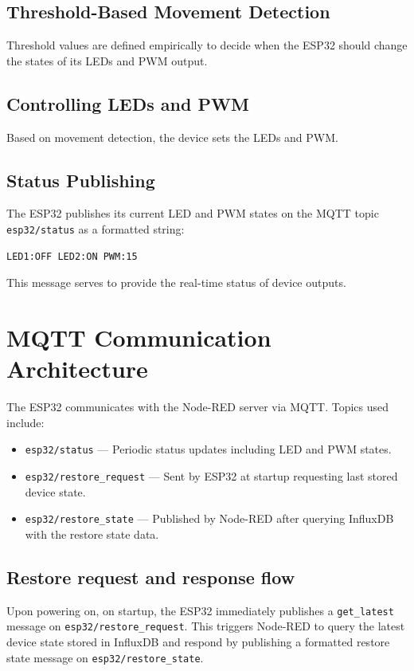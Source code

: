 \documentclass[a4paper,12pt]{article}
\begin{document}
\subsection{Threshold-Based Movement Detection}

Threshold values are defined empirically to decide when the ESP32 should 
change the states of its LEDs and PWM output.


\subsection{Controlling LEDs and PWM}

Based on movement detection, the device sets the LEDs and PWM.

\subsection{Status Publishing}

The ESP32 publishes its current LED and PWM states 
on the MQTT topic \texttt{esp32/status} as a formatted string:

{\scriptsize
\begin{verbatim}
LED1:OFF LED2:ON PWM:15
\end{verbatim}
}
This message serves to provide the
real-time status of device outputs.

\section{MQTT Communication Architecture}

The ESP32 communicates with the Node-RED 
server via MQTT. Topics used include:

\begin{itemize}
    \item \texttt{esp32/status} — Periodic status updates including LED and PWM states.
    \item \texttt{esp32/restore\_request} — Sent by ESP32 at startup requesting last stored device state.
    \item \texttt{esp32/restore\_state} — Published by Node-RED after querying InfluxDB with the restore state data.
\end{itemize}

\subsection{Restore request and response flow}

Upon powering on, on startup, 
the ESP32 immediately publishes a \texttt{get\_latest} message 
on \texttt{esp32/restore\_request}. 
This triggers Node-RED to query the latest device state 
stored in InfluxDB and respond by publishing a 
formatted restore state message on \texttt{esp32/restore\_state}.
\end{document}
